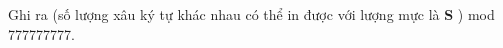 Ghi ra (số lượng xâu ký tự khác nhau có thể in được với lượng mực là   \textbf{    S   }   ) mod 777777777.  

\